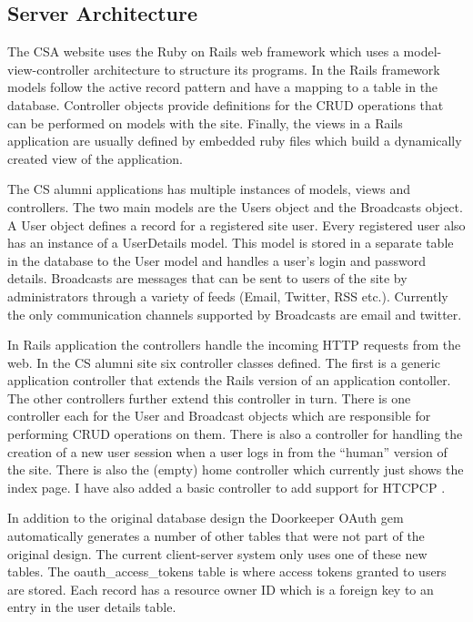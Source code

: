 \documentclass[paper=a4, fontsize=11pt]{scrartcl}	%
\numberwithin{equation}{section}															%
\numberwithin{figure}{section}																%
\numberwithin{table}{section}
\begin{document}
\subsection{Server Architecture}
\label{subsec:server-architecture}
The CSA website uses the Ruby on Rails web framework which uses a model-view-controller architecture to structure its programs. In the Rails framework models follow the active record pattern and have a mapping to a table in the database. Controller objects provide definitions for the CRUD operations that can be performed on models with the site. Finally, the views in a Rails application are usually defined by embedded ruby files which build a dynamically created view of the application.

The CS alumni applications has multiple instances of models, views and controllers. The two main models are the Users object and the Broadcasts object. A User object defines a record for a registered site user. Every registered user also has an instance of a UserDetails model. This model is stored in a separate table in the database to the User model and handles a user's login and password details. Broadcasts are messages that can be sent to users of the site by administrators through a variety of feeds (Email, Twitter, RSS etc.). Currently the only communication channels supported by Broadcasts are email and twitter.

In Rails application the controllers handle the incoming HTTP requests from the web. In the CS alumni site six controller classes defined. The first is a generic application controller that extends the Rails version of an application contoller. The other controllers further extend this controller in turn. There is one controller each for the User and Broadcast objects which are responsible for performing CRUD operations on them. There is also a controller for handling the creation of a new user session when a user logs in from the ``human'' version of the site. There is also the (empty) home controller which currently just shows the index page. I have also added a basic controller to add support for HTCPCP \cite{rfc2324htcpcp}.

In addition to the original database design the Doorkeeper OAuth gem automatically generates a number of other tables that were not part of the original design. The current client-server system only uses one of these new tables. The oauth\_access\_tokens table is where access tokens granted to users are stored. Each record has a resource owner ID which is a foreign key to an entry in the user details table.
\end{document}
